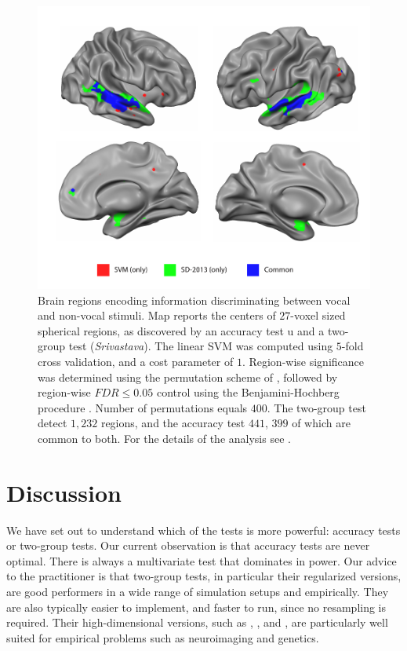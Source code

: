 \documentclass[journal]{IEEEtran}
\begin{document}
\begin{figure}[th]
	\centering
	\includegraphics[width=1\columnwidth]{"art/svm_vs_SD"}
	\caption{\footnotesize
		Brain regions encoding information discriminating between vocal and non-vocal stimuli.
		Map reports the centers of $27$-voxel sized spherical regions, as discovered by an accuracy test u and a two-group test (\emph{Srivastava}). 
		The linear SVM was computed using $5$-fold cross validation, and a cost parameter of $1$. 
		Region-wise significance was determined using the permutation scheme of \cite{stelzer_statistical_2013}, followed by region-wise $FDR \leq 0.05$ control using the Benjamini-Hochberg procedure \cite{benjamini_controlling_1995}.
		Number of permutations equals $400$.
		The two-group test detect $1,232$ regions, and the accuracy test $441$, $399$ of which are common to both.
		For the details of the analysis see \cite{gilron_quantifying_2016}.  
	}
	\label{fig:read_data}
\end{figure}








\section{Discussion}
\label{sec:discussion}

We have set out to understand which of the tests is more powerful: accuracy tests or two-group tests. 
Our current observation is that accuracy tests are never optimal.
There is always a multivariate test that dominates in power. 
Our advice to the practitioner is that two-group tests, in particular their regularized versions, are good performers in a wide range of simulation setups and empirically. 
They are also typically easier to implement, and faster to run, since no resampling is required. 
Their high-dimensional versions, such as \cite{schafer_shrinkage_2005}, \cite{goeman2006testing}, and \cite{srivastava_multivariate_2007}, are particularly well suited for empirical problems such as neuroimaging and genetics.
\end{document}
